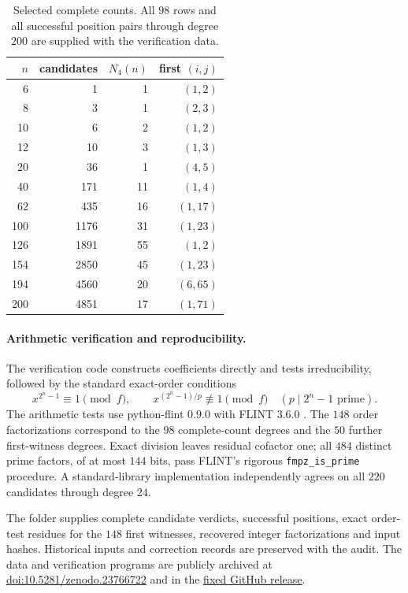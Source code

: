 \documentclass[11pt]{article}
\theoremstyle{definition}
\theoremstyle{remark}
\begin{document}
\begin{table}[ht]
\centering\small
\begin{tabular}{rrrr}
\toprule
$n$ & candidates & $N_4(n)$ & first $(i,j)$\\
\midrule
6 & 1 & 1 & $(1,2)$\\
8 & 3 & 1 & $(2,3)$\\
10 & 6 & 2 & $(1,2)$\\
12 & 10 & 3 & $(1,3)$\\
20 & 36 & 1 & $(4,5)$\\
40 & 171 & 11 & $(1,4)$\\
62 & 435 & 16 & $(1,17)$\\
100 & 1176 & 31 & $(1,23)$\\
126 & 1891 & 55 & $(1,2)$\\
154 & 2850 & 45 & $(1,23)$\\
194 & 4560 & 20 & $(6,65)$\\
200 & 4851 & 17 & $(1,71)$\\
\bottomrule
\end{tabular}
\caption{Selected complete counts. All $98$ rows and all successful
position pairs through degree $200$ are supplied with the verification data.}
\label{tab:counts}
\end{table}

\paragraph{Arithmetic verification and reproducibility.}
The verification code constructs coefficients directly and tests
irreducibility, followed by the standard exact-order conditions
\begin{equation}\label{eq:ordertest}
 x^{2^n-1}\equiv1\pmod f,\qquad
 x^{(2^n-1)/p}\not\equiv1\pmod f\quad(p\mid2^n-1\text{ prime}).
\end{equation}
The arithmetic tests use python-flint $0.9.0$ with FLINT $3.6.0$
\cite{Flint}.
The $148$ order factorizations correspond to the $98$ complete-count
degrees and the $50$ further first-witness degrees. Exact division leaves
residual cofactor one; all $484$ distinct prime factors, of at most $144$
bits, pass FLINT's rigorous \texttt{fmpz\_is\_prime} procedure.
A standard-library implementation independently agrees on all $220$
candidates through degree $24$.

The folder  supplies complete candidate
verdicts, successful positions, exact order-test residues for the $148$
first witnesses, recovered integer factorizations and input hashes.
Historical inputs and correction records are preserved with the audit.
The data and verification programs are publicly archived at
\href{https://doi.org/10.5281/zenodo.23766722}{doi:10.5281/zenodo.23766722}
and in the
\href{https://github.com/63331849121/yijing-mathematical-structures/tree/paperF-v2026.10.29-r1/PaperF_fourzero}{fixed GitHub release}.
\end{document}
